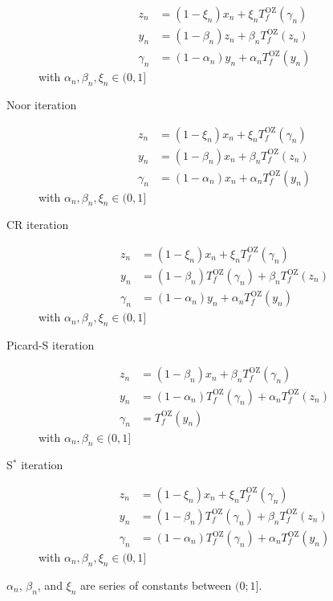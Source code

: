 \begin{description}
\begin{align}
z_n      &= (1-\xi_n)    x_n + \xi_n    T^\mathrm{OZ}_f(\gamma_{n}) \\
y_n      &= (1-\beta_n)  z_n + \beta_n  T^\mathrm{OZ}_f(z_{n}) \\
\gamma_n &= (1-\alpha_n) y_n + \alpha_n T^\mathrm{OZ}_f(y_{n})
\end{align}
with $\alpha_n,\beta_n,\xi_n \in (0,1]$
\item[Noor iteration \cite{Noor2000}]
\begin{align}
z_n      &= (1-\xi_n)    x_n + \xi_n    T^\mathrm{OZ}_f(\gamma_{n}) \\
y_n      &= (1-\beta_n)  x_n + \beta_n  T^\mathrm{OZ}_f(z_{n}) \\
\gamma_n &= (1-\alpha_n) x_n + \alpha_n T^\mathrm{OZ}_f(y_{n})
\end{align}
with $\alpha_n,\beta_n,\xi_n \in (0,1]$
\item[CR iteration \cite{Chugh2012}]
\begin{align}
z_n      &= (1-\xi_n)    x_n + \xi_n    T^\mathrm{OZ}_f(\gamma_{n}) \\
y_n      &= (1-\beta_n)  T^\mathrm{OZ}_f(\gamma_{n}) + \beta_n  T^\mathrm{OZ}_f(z_{n}) \\
\gamma_n &= (1-\alpha_n) y_n + \alpha_n T^\mathrm{OZ}_f(y_{n})
\end{align}
with $\alpha_n,\beta_n,\xi_n \in (0,1]$
\item[Picard-S iteration \cite{Gursoy2014}]
\begin{align}
z_n      &= (1-\beta_n)    x_n + \beta_n    T^\mathrm{OZ}_f(\gamma_{n}) \\
y_n      &= (1-\alpha_n)  T^\mathrm{OZ}_f(\gamma_{n}) + \alpha_n  T^\mathrm{OZ}_f(z_{n}) \\
\gamma_n &= T^\mathrm{OZ}_f(y_{n})
\end{align}
with $\alpha_n,\beta_n \in (0,1]$
\item[S$^*$ iteration \cite{Karahan2013}]
\begin{align}
z_n      &= (1-\xi_n)    x_n + \xi_n    T^\mathrm{OZ}_f(\gamma_{n}) \\
y_n      &= (1-\beta_n)  T^\mathrm{OZ}_f(\gamma_{n}) + \beta_n  T^\mathrm{OZ}_f(z_{n}) \\
\gamma_n &= (1-\alpha_n) T^\mathrm{OZ}_f(\gamma_{n}) + \alpha_n T^\mathrm{OZ}_f(y_{n})
\end{align}
with $\alpha_n,\beta_n,\xi_n \in (0,1]$
\end{description}
$\alpha_n$, $\beta_n$, and $\xi_n$ are series of constants between $(0;1]$.

